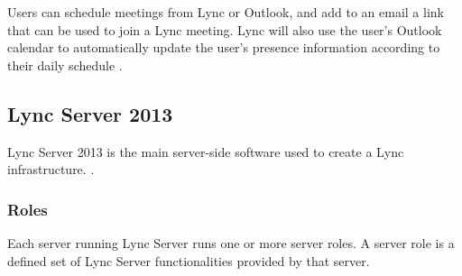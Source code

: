 Users can schedule meetings from Lync or Outlook, and add to an email a link that can be used to join a Lync meeting. Lync will also use the user's Outlook calendar to automatically update the user's presence information according to their daily schedule
\cite{winters_mastering_2012}.


\subsection{Lync Server 2013}

Lync Server 2013 is the main server-side software used to create a Lync infrastructure\cite[Ch. 1.2]{microsoft_technet_lync_2013-2,winters_mastering_2012}.
.

\subsubsection{Roles}
Each server running Lync Server runs one or more server roles. A server role is a defined set of Lync Server functionalities provided by that server.

